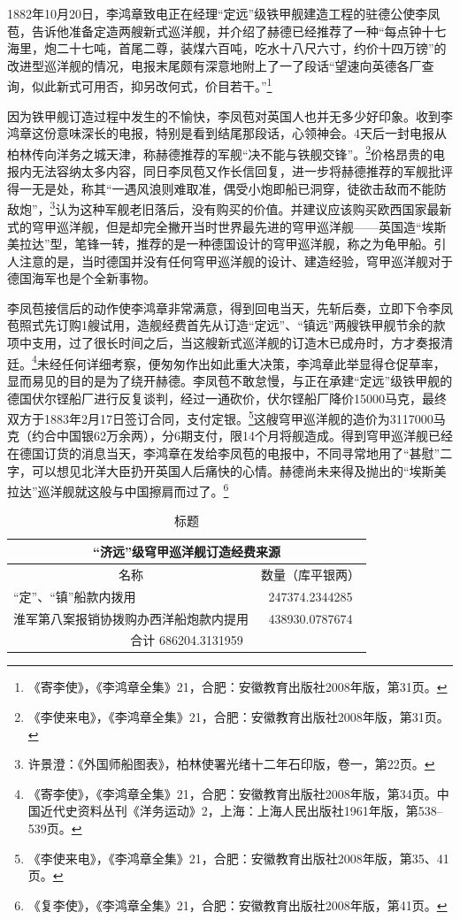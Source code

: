 \documentclass[12pt,UTF8]{ctexbook}
\begin{document}
1882年10月20日，李鸿章致电正在经理“定远”级铁甲舰建造工程的驻德公使李凤苞，告诉他准备定造两艘新式巡洋舰，并介绍了赫德已经推荐了一种“每点钟十七海里，炮二十七吨，首尾二尊，装煤六百吨，吃水十八尺六寸，约价十四万镑”的改进型巡洋舰的情况，电报末尾颇有深意地附上了一了段话“望速向英德各厂查询，似此新式可用否，抑另改何式，价目若干。”\footnote{《寄李使》，《李鸿章全集》21，合肥：安徽教育出版社2008年版，第31页。}

因为铁甲舰订造过程中发生的不愉快，李凤苞对英国人也并无多少好印象。收到李鸿章这份意味深长的电报，特别是看到结尾那段话，心领神会。4天后一封电报从柏林传向洋务之城天津，称赫德推荐的军舰“决不能与铁舰交锋”。\footnote{《李使来电》，《李鸿章全集》21，合肥：安徽教育出版社2008年版，第31页。}价格昂贵的电报内无法容纳太多内容，同日李凤苞又作长信回复，进一步将赫德推荐的军舰批评得一无是处，称其“一遇风浪则难取准，偶受小炮即船已洞穿，徒欲击敌而不能防敌炮”，\footnote{许景澄：《外国师船图表》，柏林使署光绪十二年石印版，卷一，第22页。}认为这种军舰老旧落后，没有购买的价值。并建议应该购买欧西国家最新式的穹甲巡洋舰，但是却完全撇开当时世界最先进的穹甲巡洋舰——英国造“埃斯美拉达”型，笔锋一转，推荐的是一种德国设计的穹甲巡洋舰，称之为龟甲船。引人注意的是，当时德国并没有任何穹甲巡洋舰的设计、建造经验，穹甲巡洋舰对于德国海军也是个全新事物。

李凤苞接信后的动作使李鸿章非常满意，得到回电当天，先斩后奏，立即下令李凤苞照式先订购1艘试用，造舰经费首先从订造“定远”、“镇远”两艘铁甲舰节余的款项中支用，过了很长时间之后，当这艘新式巡洋舰的订造木已成舟时，方才奏报清廷。\footnote{《寄李使》，《李鸿章全集》21，合肥：安徽教育出版社2008年版，第34页。中国近代史资料丛刊《洋务运动》2，上海：上海人民出版社1961年版，第538--539页。}未经任何详细考察，便匆匆作出如此重大决策，李鸿章此举显得仓促草率，显而易见的目的是为了绕开赫德。李凤苞不敢怠慢，与正在承建“定远”级铁甲舰的德国伏尔铿船厂进行反复谈判，经过一通砍价，伏尔铿船厂降价15000马克，最终双方于1883年2月17日签订合同，支付定银。\footnote{《李使来电》，《李鸿章全集》21，合肥：安徽教育出版社2008年版，第35、41页。}这艘穹甲巡洋舰的造价为3117000马克（约合中国银62万余两），分6期支付，限14个月将舰造成。得到穹甲巡洋舰已经在德国订货的消息当天，李鸿章在发给李凤苞的电报中，不同寻常地用了“甚慰”二字，可以想见北洋大臣扔开英国人后痛快的心情。赫德尚未来得及抛出的“埃斯美拉达”巡洋舰就这般与中国擦肩而过了。\footnote{《复李使》，《李鸿章全集》21，合肥：安徽教育出版社2008年版，第41页。}

\begin{table}[]
\centering
\label{tab:标签}
\caption{标题}
\begin{tabular}{|cc|}
\hline
\multicolumn{2}{|c|}{“济远”级穹甲巡洋舰订造经费来源}        \\ \hline
\multicolumn{1}{|c|}{名称} & 数量（库平银两）               \\ \hline
\multicolumn{1}{|l|}{“定”、“镇”船款内拨用} & 247374.2344285 \\ \hline
\multicolumn{1}{|l|}{淮军第八案报销协拨购办西洋船炮款内提用} & 438930.0787674 \\ \hline
\multicolumn{2}{|c|}{合计 686204.3131959}                   \\ \hline
\end{tabular}
\end{table}
\end{document}
